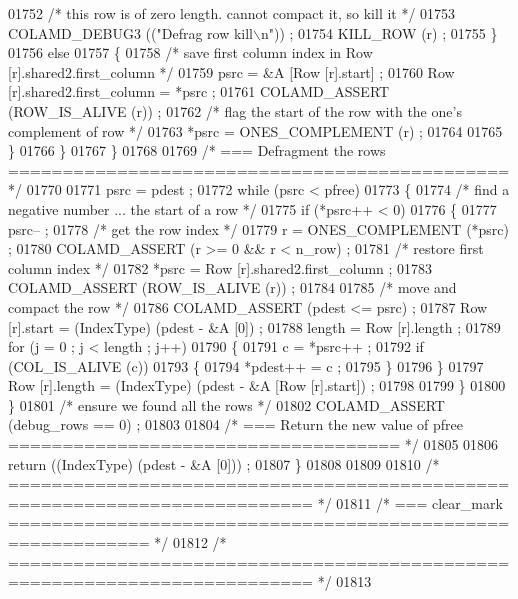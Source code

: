 \begin{DoxyCode}
{{{{{{{{{{{{{{{{{{{{{{{{{{{{01752     \textcolor{comment}{/* this row is of zero length.  cannot compact it, so kill it */}
01753     COLAMD\_DEBUG3 ((\textcolor{stringliteral}{"Defrag row kill\(\backslash\)n"})) ;
01754     KILL\_ROW (r) ;
01755       \}
01756       \textcolor{keywordflow}{else}
01757       \{
01758     \textcolor{comment}{/* save first column index in Row [r].shared2.first\_column */}
01759     psrc = &A [Row [r].start] ;
01760     Row [r].shared2.first\_column = *psrc ;
01761     COLAMD\_ASSERT (ROW\_IS\_ALIVE (r)) ;
01762     \textcolor{comment}{/* flag the start of the row with the one's complement of row */}
01763     *psrc = ONES\_COMPLEMENT (r) ;
01764 
01765       \}
01766     \}
01767   \}
01768 
01769   \textcolor{comment}{/* === Defragment the rows ============================================== */}
01770 
01771   psrc = pdest ;
01772   \textcolor{keywordflow}{while} (psrc < pfree)
01773   \{
01774     \textcolor{comment}{/* find a negative number ... the start of a row */}
01775     \textcolor{keywordflow}{if} (*psrc++ < 0)
01776     \{
01777       psrc-- ;
01778       \textcolor{comment}{/* get the row index */}
01779       r = ONES\_COMPLEMENT (*psrc) ;
01780       COLAMD\_ASSERT (r >= 0 && r < n\_row) ;
01781       \textcolor{comment}{/* restore first column index */}
01782       *psrc = Row [r].shared2.first\_column ;
01783       COLAMD\_ASSERT (ROW\_IS\_ALIVE (r)) ;
01784 
01785       \textcolor{comment}{/* move and compact the row */}
01786       COLAMD\_ASSERT (pdest <= psrc) ;
01787       Row [r].start = (IndexType) (pdest - &A [0]) ;
01788       length = Row [r].length ;
01789       \textcolor{keywordflow}{for} (j = 0 ; j < length ; j++)
01790       \{
01791     c = *psrc++ ;
01792     \textcolor{keywordflow}{if} (COL\_IS\_ALIVE (c))
01793     \{
01794       *pdest++ = c ;
01795     \}
01796       \}
01797       Row [r].length = (IndexType) (pdest - &A [Row [r].start]) ;
01798 
01799     \}
01800   \}
01801   \textcolor{comment}{/* ensure we found all the rows */}
01802   COLAMD\_ASSERT (debug\_rows == 0) ;
01803 
01804   \textcolor{comment}{/* === Return the new value of pfree ==================================== */}
01805 
01806   \textcolor{keywordflow}{return} ((IndexType) (pdest - &A [0])) ;
01807 \}
01808 
01809 
01810 \textcolor{comment}{/* ========================================================================== */}
01811 \textcolor{comment}{/* === clear\_mark =========================================================== */}
01812 \textcolor{comment}{/* ========================================================================== */}
01813 
}}}}}}}}}}}}}}}}}}}}}}}}}}}}
\end{DoxyCode}
